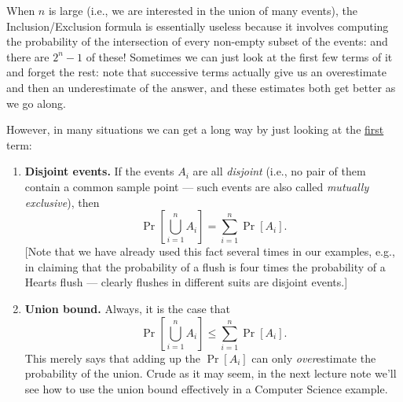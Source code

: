 \documentclass[11pt]{article}
\def\ul#1{\underline{#1}}
\begin{document}
When $n$ is large (i.e., we are interested in the union of many events),
the Inclusion/Exclusion formula is essentially useless because it
involves computing the probability of the intersection of every non-empty
subset of the events: and there are $2^n-1$ of these!  Sometimes
we can just look at the first few terms of it and forget the rest:
note that successive terms actually give us an overestimate and then
an underestimate of the answer, and these estimates both get better
as we go along.

However, in many situations we can get a long way by just looking at
the \ul{first} term:
\begin{enumerate}
\item {\bf Disjoint events.}  If the events $A_i$ are all {\it disjoint\/}
(i.e., no pair of them contain a common sample point --- such events
are also called {\it mutually exclusive\/}), then $$
   \Pr[{\textstyle\bigcup_{i=1}^n A_i}] = \sum_{i=1}^n \Pr[A_i].  $$
[Note that we have already used this fact several times in our examples,
e.g., in claiming that the probability of a flush is four times the
probability of a Hearts flush --- clearly flushes in different
suits are disjoint events.]
\item {\bf Union bound.}  Always, it is the case that $$
   \Pr[{\textstyle\bigcup_{i=1}^n A_i}] \le \sum_{i=1}^n \Pr[A_i].  $$
This merely says that adding up the $\Pr[A_i]$ can only {\it over\/}estimate
the probability of the union.  Crude as it may seem,
in the next lecture note we'll see how to use the union bound effectively
in a Computer Science example.
\end{enumerate}
\end{document}

